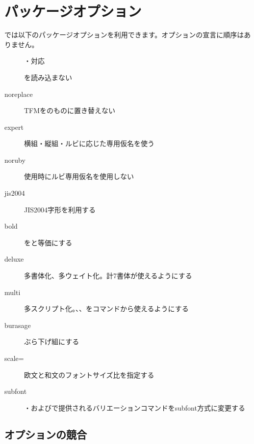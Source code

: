 \documentclass[../otf-unofficial-guide]{subfiles}
\begin{document}
\section{パッケージオプション}

では以下のパッケージオプションを利用できます。オプションの宣言に順序はありません。

\begin{description}
  \item[]
                  \tab {\pLaTeX}・{\upLaTeX}対応 %
  \vspace{0.7zw}
  \item[]
                  \tab {}を読み込まない
  \vspace{0.7zw}
  \item[noreplace] \tab TFMをのものに置き替えない
  \item[expert]    \tab 横組・縦組・ルビに応じた専用仮名を使う
  \item[noruby]    \tab {}使用時にルビ専用仮名を使用しない
  \item[jis2004]   \tab JIS2004字形を利用する
  \item[bold]      \tab {}をと等価にする
  \item[deluxe]    \tab 多書体化、多ウェイト化。計7書体が使えるようにする
  \item[multi]     \tab 多スクリプト化。{\fantizi}、{\jiantizi}、{\hankgo}をコマンドから使えるようにする
  \item[burasage]   \tab ぶら下げ組にする
  \item[scale=]
                    \tab 欧文と和文のフォントサイズ比を指定する
  \item[subfont]    \tab {}・およびで提供されるバリエーションコマンドをsubfont方式に変更する%
\end{description}

\subsection{オプションの競合}
\end{document}
